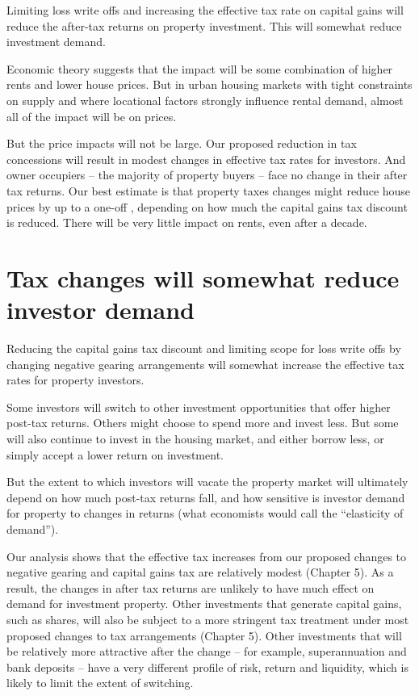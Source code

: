 \documentclass{grattan}\usepackage[]{graphicx}\usepackage[]{color}
\begin{document}
Limiting loss write offs and increasing the effective tax rate on capital gains will reduce the after-tax returns on property investment. This will somewhat reduce investment demand. 

Economic theory suggests that the impact will be some combination of higher rents and lower house prices. But in urban housing markets with tight constraints on supply and where locational factors strongly influence rental demand, almost all of the impact will be on prices.  

But the price impacts will not be large. Our proposed reduction in tax concessions will result in modest changes in effective tax rates for investors. And owner occupiers -- the majority of property buyers -- face no change in their after tax returns. Our best estimate is that property taxes changes might reduce house prices by up to a one-off , depending on how much the capital gains tax discount is reduced. There will be very little impact on rents, even after a decade.

\section{Tax changes will somewhat reduce investor demand}
Reducing the capital gains tax discount and limiting scope for loss write offs by changing negative gearing arrangements will somewhat increase the effective tax rates for property investors. 

Some investors will switch to other investment opportunities that offer higher post-tax returns. Others might choose to spend more and invest less. But some will also continue to invest in the housing market, and either borrow less, or simply accept a lower return on investment.

But the extent to which investors will vacate the property market will ultimately depend on how much post-tax returns fall, and how sensitive is investor demand for property to changes in returns (what economists would call the “elasticity of demand”).

Our analysis shows that the effective tax increases from our proposed changes to negative gearing and capital gains tax are relatively modest (Chapter 5). 
As a result, the changes in after tax returns are unlikely to have much effect on demand for investment property. Other investments that generate capital gains, such as shares, will also be subject to a more stringent tax treatment under most proposed changes to tax arrangements (Chapter 5). Other investments that will be relatively more attractive after the change -- for example, superannuation and bank deposits -- have a very different profile of risk, return and liquidity, which is likely to limit the extent of switching. 
\end{document}
